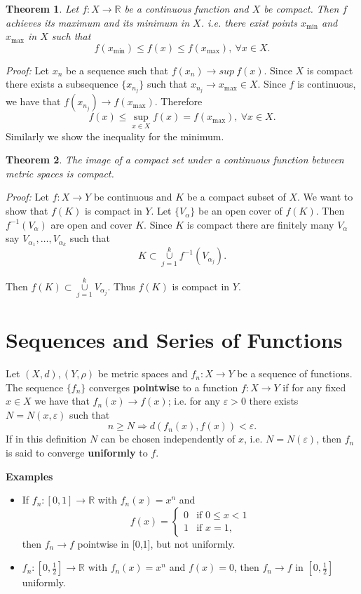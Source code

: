 \documentclass[12pt]{report}
\newtheorem{theorem}{Theorem}[section]
\begin{document}
\begin{theorem} 
\label{th:cont-maxmin}
Let $f: X \longrightarrow \mathbb{R}$ be
a continuous function and $X$ be compact.  Then $f$ achieves its
maximum and its minimum in $X$. i.e. there exist points $x_{\min}$
and $x_{\max}$ in $X$ such that
\[ f(x_{\min}) \le f(x) \le f(x_{\max}), \ \forall x \in X.
\]
\end{theorem}
\textit{Proof:}  Let $x_n$ be a sequence such that $f(x_n)
\longrightarrow sup\ f(x)$.  Since $X$ is compact there exists a
subsequence $\{x_{n_j}\}$ such that
$x_{n_j}
\longrightarrow x_{\max} \in X$.  Since $f$ is continuous, we have 
that $f(x_{n_j})
\longrightarrow f(x_{\max})$.  Therefore
\[ f(x) \le \sup_{x \in X} f(x) = f(x_{\max}), \ \forall
x \in X.
\]
 Similarly we show the inequality for the minimum.

\begin{theorem} 
\label{th:image-compact}
The image of a compact set under a
continuous function between metric spaces is compact.
\end{theorem}
\textit{Proof:}  Let $f: X \longrightarrow Y$ be continuous and $K$ be
a compact subset of $X$.  We want to show  that $f(K)$ is compact in
$Y$.  Let $\{V_\alpha\}$ be an open cover of $f(K)$.  Then $f^{-1}
(V_\alpha)$ are open  and cover $K$.  Since $K$ is compact there are
finitely many $V_\alpha$ say $V_{\alpha_1}, \dots, V_{\alpha_k}$
such that
\[
 K \subset \overset{k}{\underset{j=1}{\cup}} f^{-1} (V_{\alpha_j}).
\]

Then $ f(K) \subset \overset{k}{\underset{j=1}{\cup}}  
V_{\alpha_j}.$ Thus $f(K)$ is compact in $Y$.  


\section{Sequences and Series of Functions}
 Let $(X, d), (Y, \rho)$ be metric spaces and  $f_n: X
\longrightarrow Y$ be a sequence of functions.  The sequence
$\{f_n\}$ converges \textbf{pointwise} to a function $f: X
\longrightarrow Y$ if for any fixed $x \in X$ we have that $f_n(x)
\longrightarrow f(x)$; i.e.  for any $\varepsilon > 0 $ there exists $N =
N(x, \varepsilon)$ such that
\[ n \ge N \Longrightarrow d(f_n(x), f(x)) < \varepsilon.
\] If in this definition $N$ can  be chosen independently of $x$, i.e. $N
= N(\varepsilon)$, then $f_n$ is said to converge \textbf{uniformly}
to $f$.


\medskip
\noindent
\textbf{Examples}
\begin{itemize}
\item[1. ] If $f_n: [0,1] \longrightarrow \mathbb{R}$ with $f_n(x) =
x^n$ and
\[f(x) = \left \{ \begin{array}{ll} 0 &\mbox{if } 0 \le x < 1\\ 1 &\mbox{
if } x = 1 ,\end{array}\right .
\] then $f_n \longrightarrow f$ pointwise in [0,1], but not uniformly.

\item[2. ]  $f_n: \left [0,\frac{1}{2} \right ]\longrightarrow
\mathbb{R}$ with $f_n(x) = x^n$ and
$f(x) = 0$, then $f_n \longrightarrow f$ in $\left [ 0, \frac{1}{2} \right
]$ uniformly.
\end{itemize}
\end{document}
